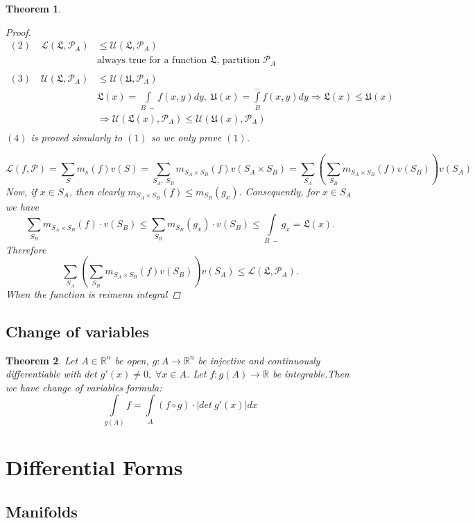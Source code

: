 \documentclass[12pt]{article}
\def\RR{\mathbb{R}}
\newtheorem{theorem}{Theorem}[section]
\begin{document}
\begin{theorem}
\begin{proof}
\begin{align*}
(2) \quad \mathcal{L}(\mathfrak{L},\mathcal{P}_A) &\leq \mathcal{U}(\mathfrak{L},\mathcal{P}_A) \\ &\text{always true for  a function $\mathfrak{L}$, partition $\mathcal{P}_A$} \\ \;& \; \\
(3) \quad \mathcal{U}(\mathfrak{L},\mathcal{P}_A) &\leq \mathcal{U}(\mathfrak{U},\mathcal{P}_A)\\
&\mathfrak{L}(x)  =\int\limits_{B \;-}f(x,y)dy, \; \mathfrak{U}(x)  =\int\limits_{B}^{-}f(x,y)dy \Rightarrow \mathfrak{L}(x) \leq \mathfrak{U}(x) \\
 &\Rightarrow \mathcal{U}(\mathfrak{L}(x), \mathcal{P}_A) \leq \mathcal{U}(\mathfrak{U}(x), \mathcal{P}_A) \\
\end{align*}
$(4)$ is proved simularly to $(1)$ so we only prove $(1)$. 

\[\mathcal{L}(f,\mathcal{P})= \sum_{S}m_{s}(f) v(S) = \sum_{S_A, \; S_B}\! m_{S_A \times S_B}(f)  v(S_A \times S_B) = \sum_{S_A}\left(\sum_{S_B} m_{S_A \times S_B}(f)  v(S_B) \right)\! v(S_A)\]
Now, if $x \in S_A$, then clearly $m_{S_A \times S_B}(f) \leq m_{S_B}(g_x).$ Consequently, for $x \in S_A$ we have
\[\sum_{S_B} m_{S_A \times S_B}(f) \cdot v(S_B) \leq \sum_{S_B}m_{S_B}(g_x)\cdot v(S_B) \leq \int\limits_{B \;-}g_x = \mathfrak{L}(x).\]
Therefore
\[\sum_{S_A}\left(\sum_{S_B} m_{S_A \times S_B}(f)  v(S_B) \right)\! v(S_A) \leq \mathcal{L}(\mathfrak{L}, \mathcal{P}_A).\]
When the function is reimenn integral
\end{proof}
\end{theorem}

\subsection{Change of variables}
\begin{theorem}
Let $A \in \RR^n$ be open, $g:A \rightarrow \RR^n$ be injective and continuously differentiable with $det \;g'(x) \neq 0, \; \forall x \in A$. Let $f:g(A) \rightarrow \RR$ be integrable.Then we have change of variables formula:
\[\int\limits_{g(A)}\!f=\int\limits_{A}(f \circ g)\cdot |det \:g'(x)|dx\]
\end{theorem}

\section{Differential Forms}
\subsection{Manifolds}
\end{document}
